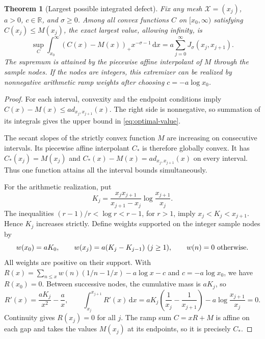 \documentclass[11pt]{article}
\newtheorem{theorem}{Theorem}[section]
\theoremstyle{definition}
\newcommand{\R}{\mathbb R}
\newcommand{\mesh}{\mathcal X}
\newcommand{\dd}{\,\mathrm d}
\begin{document}
\begin{theorem}[Largest possible integrated defect]\label{thm:optimal}
Fix any mesh \(\mesh=(x_j)\), \(a>0\), \(c\in\R\), and \(\sigma\geq0\).
Among all convex functions \(C\) on \([x_0,\infty)\) satisfying
\(C(x_j)\leq M(x_j)\), the exact largest value, allowing infinity, is
\begin{equation}\label{eq:optimal-value}
 \sup_C\int_{x_0}^\infty(C(x)-M(x))_+x^{-\sigma-1}\dd x
       =a\sum_{j=0}^\infty J_\sigma(x_j,x_{j+1}).
\end{equation}
The supremum is attained by the piecewise affine interpolant of \(M\)
through the sample nodes. If the nodes are integers, this extremizer can
be realized by nonnegative arithmetic ramp weights after choosing
\(c=-a\log x_0\).
\end{theorem}
\begin{proof}
For each interval, convexity and the endpoint conditions imply
\(C(x)-M(x)\leq ad_{x_j,x_{j+1}}(x)\).
The right side is nonnegative, so summation of its integrals gives the
upper bound in \eqref{eq:optimal-value}.

The secant slopes of the strictly convex function \(M\) are increasing
on consecutive intervals. Its piecewise affine interpolant \(C_*\) is
therefore globally convex. It has \(C_*(x_j)=M(x_j)\) and
\(C_*(x)-M(x)=ad_{x_j,x_{j+1}}(x)\) on every interval. Thus one
function attains all the interval bounds simultaneously.

For the arithmetic realization, put
\[
 K_j=\frac{x_jx_{j+1}}{x_{j+1}-x_j}
                    \log\frac{x_{j+1}}{x_j}.
\]
The inequalities \((r-1)/r<\log r<r-1\), for \(r>1\), imply
\(x_j<K_j<x_{j+1}\). Hence \(K_j\) increases strictly. Define weights
supported on the integer sample nodes by
\begin{equation}\label{eq:extremal-weights}
 w(x_0)=aK_0,\qquad
 w(x_j)=a(K_j-K_{j-1})\ (j\geq1),\qquad
 w(n)=0\ \hbox{otherwise}.
\end{equation}
All weights are positive on their support. With
\(R(x)=\sum_{n\leq x}w(n)(1/n-1/x)-a\log x-c\) and
\(c=-a\log x_0\), we have \(R(x_0)=0\). Between successive nodes,
the cumulative mass is \(aK_j\), so
\[
 R'(x)=\frac{aK_j}{x^2}-\frac ax,
 \qquad
 \int_{x_j}^{x_{j+1}}R'(x)\dd x
 =aK_j\left(\frac1{x_j}-\frac1{x_{j+1}}\right)
       -a\log\frac{x_{j+1}}{x_j}=0.
\]
Continuity gives \(R(x_j)=0\) for all \(j\). The ramp sum \(C=xR+M\)
is affine on each gap and takes the values \(M(x_j)\) at its endpoints,
so it is precisely \(C_*\).
\end{proof}
\end{document}
